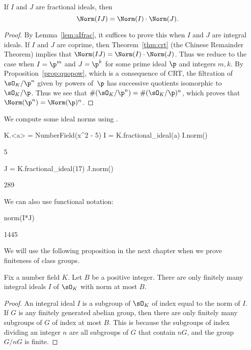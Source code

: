 \begin{proposition}
  If $I$ and $J$ are fractional ideals, then
  \[
    \Norm(IJ) = \Norm(I)\cdot \Norm(J).
  \]
\end{proposition}
\begin{proof}
  By Lemma~\ref{lem:aIfrac}, it suffices to prove this when $I$ and $J$ are
  integral ideals.  If $I$ and $J$ are coprime, then
  Theorem~\ref{thm:crt} (the Chinese Remainder Theorem) implies that
  $\Norm(IJ) = \Norm(I)\cdot \Norm(J)$.  Thus we reduce to the case when
  $I=\p^m$ and $J=\p^k$ for some prime ideal $\p$ and integers $m,k$.
  By Proposition~\ref{prop:quopow}, which is
  a consequence of CRT, the filtration of $\sO_K/\p^{n}$ given
  by powers of~$\p$ has successive quotients isomorphic to $\sO_K/\p$.
  Thus  we see that $\#(\sO_K/\p^{n}) = \#(\sO_K/\p)^{n}$, which proves that
  $\Norm(\p^n)=\Norm(\p)^n$.
\end{proof}

\begin{example}
  We compute some ideal norms using {\Sage}.
\begin{sagecode}
\begin{sagecell}
K.<a> = NumberField(x^2 - 5)
I = K.fractional_ideal(a)
I.norm()
\end{sagecell}
\begin{sageout}
5
\end{sageout}
\begin{sagecell}
J = K.fractional_ideal(17)
J.norm()
\end{sagecell}
\begin{sageout}
289
\end{sageout}
\end{sagecode} %
\noindent{} We can also use functional notation:
\begin{sagecode} %
\begin{sagecell}
norm(I*J)
\end{sagecell}
\begin{sageout}
1445
\end{sageout}
\end{sagecode}
\end{example}

We will use the following proposition in the next chapter when
we prove finiteness of class groups.
\begin{proposition}\label{prop:finitewithnorm}%
  Fix a number field $K$.
  Let $B$ be a positive integer.  There
  are only finitely many integral ideals
  $I$ of $\sO_K$ with norm at most $B$.
\end{proposition}
\begin{proof}
  An integral ideal $I$ is a subgroup of $\sO_K$ of index equal to the
  norm of $I$.  If $G$ is any finitely generated abelian group, then
  there are only finitely many subgroups of $G$ of index at most $B$.
  This is because the subgroups of index dividing an integer $n$ are all subgroups
  of $G$ that contain $nG$, and the group $G/nG$ is finite.
\end{proof}
